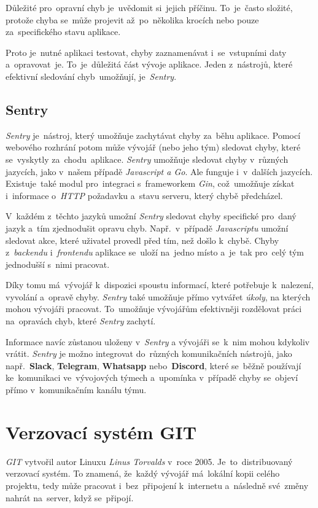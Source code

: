\documentclass[11pt,a4paper]{report}
\begin{document}
                Důležité pro~opravní chyb je~uvědomit si~jejich příčinu. To~je~často složité, protože chyba se~může projevit až~po~několika krocích nebo pouze za~specifického stavu aplikace. \cite{graham2021ethical}

                Proto je~nutné aplikaci testovat, chyby zaznamenávat i~se~vstupními daty a~opravovat~je. To~je~důležitá část vývoje aplikace. Jeden z~nástrojů, které efektivní sledování chyb~umožňují, je~\emph{Sentry}.

            \subsection{Sentry}
                \emph{Sentry} je~nástroj, který umožňuje zachytávat chyby za~běhu aplikace. Pomocí webového rozhrání potom může vývojář (nebo jeho tým) sledovat chyby, které se~vyskytly za~chodu~aplikace. \emph{Sentry} umožňuje sledovat chyby v~různých jazycích, jako v~našem případě \emph{Javascript a Go}. Ale funguje i~v~dalších jazycích. Existuje~také modul pro~integraci s~frameworkem \emph{Gin}, což~umožňuje získat i~informace o~\emph{HTTP} požadavku a~stavu serveru, který chybě předcházel.
                
                V~každém z~těchto jazyků umožní \emph{Sentry} sledovat chyby specifické pro~daný jazyk a~tím zjednodušit opravu chyb. Např.~v~případě \emph{Javascriptu} umožní sledovat akce, které uživatel provedl před tím, než došlo k~chybě. Chyby z~\emph{backendu} i~\emph{frontendu} aplikace se~uloží na~jedno místo a~je~tak pro~celý tým jednodušší s~nimi pracovat.

                Díky tomu má~vývojář k~dispozici spoustu informací, které potřebuje k~nalezení, vyvolání a~opravě chyby. \emph{Sentry} také umožňuje přímo vytvářet \emph{úkoly}, na kterých mohou vývojáři pracovat. To~umožňuje vývojářům efektivněji rozdělovat práci na~opravách chyb, které \emph{Sentry} zachytí.

                Informace navíc zůstanou uloženy v~\emph{Sentry} a vývojáři se~k~nim mohou kdykoliv vrátit. \emph{Sentry} je možno integrovat do~různých komunikačních nástrojů, jako např.~\textbf{Slack}, \textbf{Telegram}, \textbf{Whatsapp} nebo~\textbf{Discord}, které se~běžně používají ke~komunikaci ve~vývojových týmech a~upomínka v~případě chyby se~objeví přímo v~komunikačním kanálu týmu.
	
        \section{Verzovací systém GIT}
            \emph{GIT} vytvořil autor Linuxu \emph{Linus Torvalds} v~roce 2005. Je~to~distribuovaný verzovací systém. To znamená, že~každý vývojář má~lokální kopii celého projektu, tedy může pracovat i~bez~připojení k~internetu a~následně své~změny nahrát na~server, když se~připojí.
            
\end{document}
